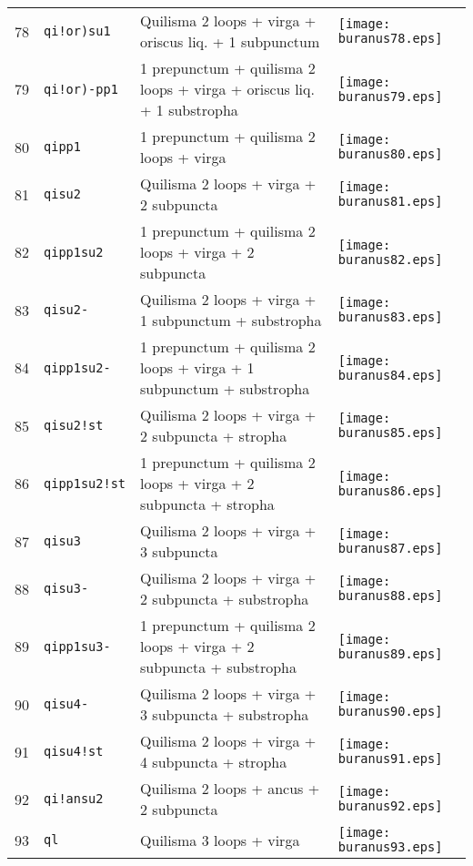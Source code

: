 \documentclass{scrarticle}
\begin{document}
\begin{longtable}{l|l|l|l}
78 & \texttt{qi!or)su1} & Quilisma 2 loops + virga + oriscus liq. + 1 subpunctum & \texttt{[image: buranus78.eps]} \\
79 & \texttt{qi!or)-pp1} & 1 prepunctum + quilisma 2 loops + virga + oriscus liq. + 1 substropha & \texttt{[image: buranus79.eps]} \\
80 & \texttt{qipp1} & 1 prepunctum + quilisma 2 loops + virga & \texttt{[image: buranus80.eps]} \\
81 & \texttt{qisu2} & Quilisma 2 loops + virga + 2 subpuncta & \texttt{[image: buranus81.eps]} \\
82 & \texttt{qipp1su2} & 1 prepunctum + quilisma 2 loops + virga + 2 subpuncta & \texttt{[image: buranus82.eps]} \\
83 & \texttt{qisu2-} & Quilisma 2 loops + virga + 1 subpunctum + substropha & \texttt{[image: buranus83.eps]} \\
84 & \texttt{qipp1su2-} & 1 prepunctum + quilisma 2 loops + virga + 1 subpunctum + substropha & \texttt{[image: buranus84.eps]} \\
85 & \texttt{qisu2!st} & Quilisma 2 loops + virga + 2 subpuncta + stropha & \texttt{[image: buranus85.eps]} \\
86 & \texttt{qipp1su2!st} & 1 prepunctum + quilisma 2 loops + virga + 2 subpuncta + stropha & \texttt{[image: buranus86.eps]} \\
87 & \texttt{qisu3} & Quilisma 2 loops + virga + 3 subpuncta & \texttt{[image: buranus87.eps]} \\
88 & \texttt{qisu3-} & Quilisma 2 loops + virga + 2 subpuncta + substropha & \texttt{[image: buranus88.eps]} \\
89 & \texttt{qipp1su3-} & 1 prepunctum + quilisma 2 loops + virga + 2 subpuncta + substropha & \texttt{[image: buranus89.eps]} \\
90 & \texttt{qisu4-} & Quilisma 2 loops + virga + 3 subpuncta + substropha & \texttt{[image: buranus90.eps]} \\
91 & \texttt{qisu4!st} & Quilisma 2 loops + virga + 4 subpuncta + stropha & \texttt{[image: buranus91.eps]} \\
92 & \texttt{qi!ansu2} & Quilisma 2 loops + ancus + 2 subpuncta & \texttt{[image: buranus92.eps]} \\
93 & \texttt{ql} & Quilisma 3 loops + virga & \texttt{[image: buranus93.eps]} \\

\end{longtable}
\end{document}
